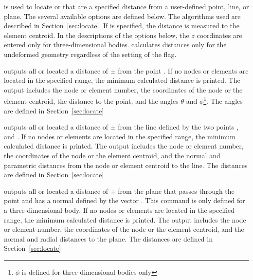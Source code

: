  {
 is used to locate  or  that are a
specified distance from a user-defined point, line, or plane.  The
several available options are defined below.  The algorithms used are
described in Section~\ref{sec:locate}.  If  is specified,
the distance is measured to the element centroid.  In the descriptions
of the  options below, the $z$ coordinates are entered only
for three-dimensional bodies.   calculates distances only
for the undeformed geometry regardless of the setting of the
 flag.

 {
outputs all  or  located a
distance of $\pm$ from the
point .  If no nodes or elements are
located in the specified range, the minimum calculated distance
is printed.  The output includes the node or element number, the
coordinates of the node or the element centroid, the distance to the
point, and the angles $\theta$ and $\phi$\footnote{$\phi$ is defined for
three-dimensional bodies only}.  The angles are defined in
Section~\ref{sec:locate}
}

 {
outputs all  or  located a distance of
$\pm$ from the line defined by the two
points , and . If
no nodes or elements are located in the specified range, the minimum
calculated distance is printed.  The output includes the node or element
number, the coordinates of the node or the element centroid, and the
normal and parametric distances from the node or element centroid to the
line.  The distances are defined in Section~\ref{sec:locate}
}

 {
outputs all  or  located a
distance of $\pm$ from the plane that
passes through the point  and has a normal
defined by the vector . This command is only
defined for a three-dimensional body.  If no nodes or elements are
located in the specified range, the minimum calculated distance is
printed.  The output includes the node or element number, the
coordinates of the node or the element centroid, and the normal and
radial distances to the plane.  The distances are defined in
Section~\ref{sec:locate}
}
}

